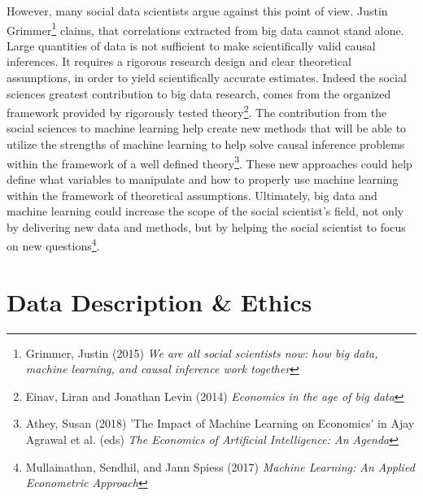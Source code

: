 \documentclass[12pt,a4paper]{article}
\begin{document}
However, many social data scientists argue against this point of view. Justin Grimmer\footnote{Grimmer, Justin (2015) \textit{We are all social scientists now: how big data, machine learning, and causal inference work together}} claims, that correlations extracted from big data cannot stand alone. Large quantities of data is not sufficient to make scientifically valid causal inferences. It requires a rigorous research design and clear theoretical assumptions, in order to yield scientifically accurate estimates. Indeed the social sciences greatest contribution to big data research, comes from the organized framework provided by rigorously tested theory\footnote{Einav, Liran and Jonathan Levin (2014) \textit{Economics in the age of big data}}.\newline
The contribution from the social sciences to machine learning help create new methods that will be able to utilize the strengths of machine learning to help solve causal inference problems within the framework of a well defined theory\footnote{Athey, Susan (2018) 'The Impact of Machine Learning on Economics' in Ajay Agrawal et al. (eds) \textit{The Economics of Artificial Intelligence: An Agenda}}. These new approaches could help define what variables to manipulate and how to properly use machine learning within the framework of theoretical assumptions. Ultimately, big data and machine learning could increase the scope of the social scientist's field, not only by delivering new data and methods, but by helping the social scientist to focus on new questions\footnote{Mullainathan, Sendhil, and Jann Spiess (2017) \textit{Machine Learning: An Applied Econometric Approach}}.

\section{Data Description \& Ethics}
\end{document}
